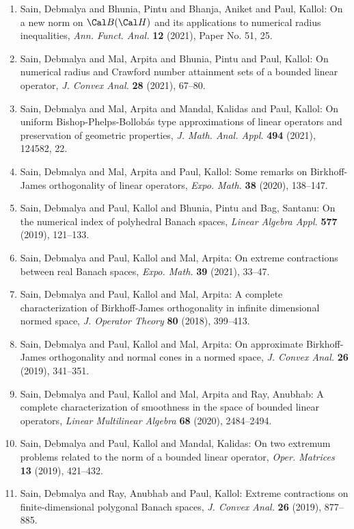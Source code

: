 \begin{enumerate}
\item Sain, Debmalya and Bhunia, Pintu and Bhanja, Aniket and Paul,
Kallol: On a new norm on {$\Cal B(\Cal H)$} and its applications to
numerical radius inequalities, \emph{Ann. Funct. Anal.} {\bf 12} (2021), Paper No. 51, 25.
\item Sain, Debmalya and Mal, Arpita and Bhunia, Pintu and Paul,
Kallol: On numerical radius and {C}rawford number attainment sets of a
bounded linear operator, \emph{J. Convex Anal.} {\bf 28} (2021), 67--80.
\item Sain, Debmalya and Mal, Arpita and Mandal, Kalidas and Paul,
Kallol: On uniform {B}ishop-{P}helps-{B}ollob\'{a}s type approximations of
linear operators and preservation of geometric properties, \emph{J. Math. Anal. Appl.} {\bf 494} (2021), 124582, 22.
\item Sain, Debmalya and Mal, Arpita and Paul, Kallol: Some remarks on {B}irkhoff-{J}ames orthogonality of linear
operators, \emph{Expo. Math.} {\bf 38} (2020), 138--147.
\item Sain, Debmalya and Paul, Kallol and Bhunia, Pintu and Bag,
Santanu: On the numerical index of polyhedral {B}anach spaces, \emph{Linear Algebra Appl.} {\bf 577} (2019), 121--133.
\item Sain, Debmalya and Paul, Kallol and Mal, Arpita: On extreme contractions between real {B}anach spaces, \emph{Expo. Math.} {\bf 39} (2021), 33--47.
\item Sain, Debmalya and Paul, Kallol and Mal, Arpita: A complete characterization of {B}irkhoff-{J}ames
orthogonality in infinite dimensional normed space, \emph{J. Operator Theory} {\bf 80} (2018), 399--413.
\item Sain, Debmalya and Paul, Kallol and Mal, Arpita: On approximate {B}irkhoff-{J}ames orthogonality and normal
cones in a normed space, \emph{J. Convex Anal.} {\bf 26} (2019), 341--351.
\item Sain, Debmalya and Paul, Kallol and Mal, Arpita and Ray,
Anubhab: A complete characterization of smoothness in the space of
bounded linear operators, \emph{Linear Multilinear Algebra} {\bf 68} (2020), 2484--2494.
\item Sain, Debmalya and Paul, Kallol and Mandal, Kalidas: On two extremum problems related to the norm of a bounded
linear operator, \emph{Oper. Matrices} {\bf 13} (2019), 421--432.
\item Sain, Debmalya and Ray, Anubhab and Paul, Kallol: Extreme contractions on finite-dimensional polygonal {B}anach
spaces, \emph{J. Convex Anal.} {\bf 26} (2019), 877--885.

\end{enumerate}
